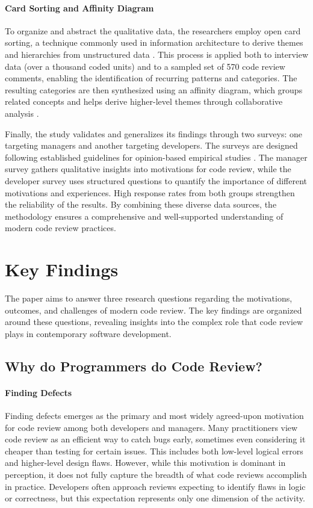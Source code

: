 \paragraph{Card Sorting and Affinity Diagram}
To organize and abstract the qualitative data, the researchers employ open card sorting, a technique commonly used in information architecture to derive themes and hierarchies from unstructured data \cite{barker2005information}. This process is applied both to interview data (over a thousand coded units) and to a sampled set of 570 code review comments, enabling the identification of recurring patterns and categories. The resulting categories are then synthesized using an affinity diagram, which groups related concepts and helps derive higher-level themes through collaborative analysis \cite{janis2000improving}.

Finally, the study validates and generalizes its findings through two surveys: one targeting managers and another targeting developers. The surveys are designed following established guidelines for opinion-based empirical studies \cite{kitchenham2007personal}. The manager survey gathers qualitative insights into motivations for code review, while the developer survey uses structured questions to quantify the importance of different motivations and experiences. High response rates from both groups strengthen the reliability of the results. By combining these diverse data sources, the methodology ensures a comprehensive and well-supported understanding of modern code review practices.

\section{Key Findings}
The paper aims to answer three research questions regarding the motivations, outcomes, and challenges of modern code review. The key findings are organized around these questions, revealing insights into the complex role that code review plays in contemporary software development.
\subsection{Why do Programmers do Code Review?}

\paragraph{Finding Defects}
Finding defects emerges as the primary and most widely agreed-upon motivation for code review among both developers and managers. Many practitioners view code review as an efficient way to catch bugs early, sometimes even considering it cheaper than testing for certain issues. This includes both low-level logical errors and higher-level design flaws. However, while this motivation is dominant in perception, it does not fully capture the breadth of what code reviews accomplish in practice. Developers often approach reviews expecting to identify flaws in logic or correctness, but this expectation represents only one dimension of the activity.

